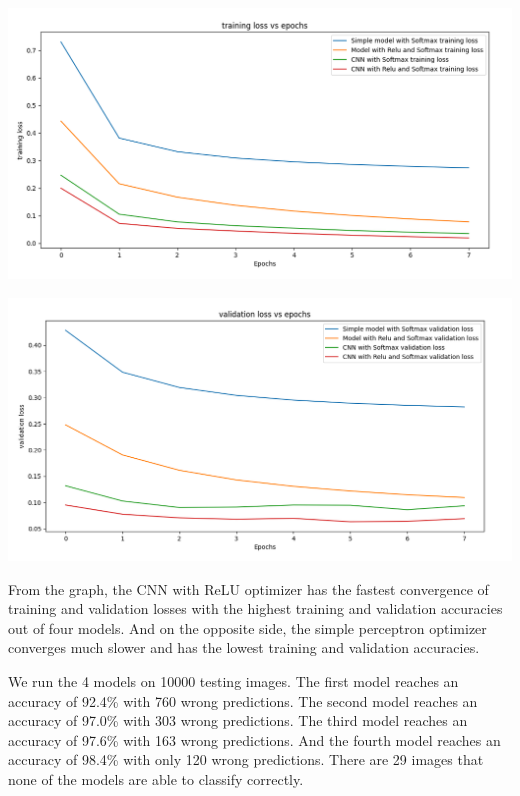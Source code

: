 \documentclass[11pt]{amsart}
\begin{document}
\hspace{-0.3in}
\begin{minipage}{0.52\linewidth}
\includegraphics[width = \linewidth]{Training_loss.png}
\end{minipage}
\begin{minipage}{0.52\linewidth}
\includegraphics[width = \linewidth]{Validation_loss.png}
\end{minipage}
\smallskip

From the graph, the CNN with ReLU optimizer has the fastest convergence of training and validation losses with the highest training and validation accuracies out of four models. And on the opposite side, the simple perceptron optimizer converges much slower and has the lowest training and validation accuracies.

We run the 4 models on 10000 testing images. The first model reaches an accuracy of 92.4\% with 760 wrong predictions. The second model
reaches an accuracy of 97.0\% with 303 wrong predictions. The third model reaches an accuracy of 97.6\% with 163 wrong predictions. And the fourth  model reaches an accuracy of 98.4\% with only 120 wrong predictions. There are 29 images that none of the models are able to classify correctly.
\end{document}
